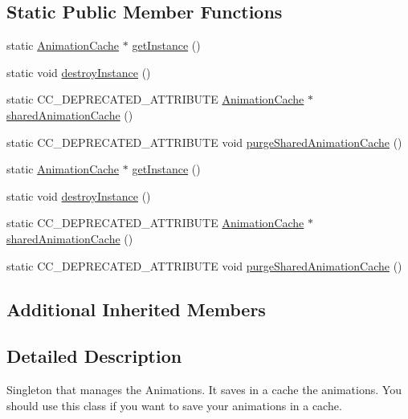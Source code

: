\subsection*{Static Public Member Functions}
\begin{DoxyCompactItemize}
\item 
static \hyperlink{classAnimationCache}{Animation\+Cache} $\ast$ \hyperlink{classAnimationCache_af742b69910d1739949ac532cfc3ea30c}{get\+Instance} ()
\item 
static void \hyperlink{classAnimationCache_afb31dcea7d004565aaf1b871e59eec30}{destroy\+Instance} ()
\item 
static C\+C\+\_\+\+D\+E\+P\+R\+E\+C\+A\+T\+E\+D\+\_\+\+A\+T\+T\+R\+I\+B\+U\+TE \hyperlink{classAnimationCache}{Animation\+Cache} $\ast$ \hyperlink{classAnimationCache_ad8f32209ad141f9244ec14ba960579f0}{shared\+Animation\+Cache} ()
\item 
static C\+C\+\_\+\+D\+E\+P\+R\+E\+C\+A\+T\+E\+D\+\_\+\+A\+T\+T\+R\+I\+B\+U\+TE void \hyperlink{classAnimationCache_ad9863fb791f64c88908c5b6e3a8ce745}{purge\+Shared\+Animation\+Cache} ()
\item 
static \hyperlink{classAnimationCache}{Animation\+Cache} $\ast$ \hyperlink{classAnimationCache_a5b76a593eee51827cec2915ce870c7cf}{get\+Instance} ()
\item 
static void \hyperlink{classAnimationCache_aae847315aea84ed223f1b2f2731348d5}{destroy\+Instance} ()
\item 
static C\+C\+\_\+\+D\+E\+P\+R\+E\+C\+A\+T\+E\+D\+\_\+\+A\+T\+T\+R\+I\+B\+U\+TE \hyperlink{classAnimationCache}{Animation\+Cache} $\ast$ \hyperlink{classAnimationCache_ad8f32209ad141f9244ec14ba960579f0}{shared\+Animation\+Cache} ()
\item 
static C\+C\+\_\+\+D\+E\+P\+R\+E\+C\+A\+T\+E\+D\+\_\+\+A\+T\+T\+R\+I\+B\+U\+TE void \hyperlink{classAnimationCache_ad9863fb791f64c88908c5b6e3a8ce745}{purge\+Shared\+Animation\+Cache} ()
\end{DoxyCompactItemize}
\subsection*{Additional Inherited Members}


\subsection{Detailed Description}
Singleton that manages the Animations. It saves in a cache the animations. You should use this class if you want to save your animations in a cache.

